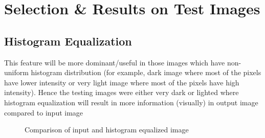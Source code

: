 \documentclass[letterpaper, 10 pt, conference]{ieeeconf}  %
\begin{document}
\section{\textbf{Selection \& Results on Test Images}}
\subsection{\textbf{Histogram Equalization}}
This feature will be more dominant/useful in those images which have non-uniform histogram distribution (for example, dark image where most of the pixels have lower intensity or very light image where most of the pixels have high intensity). Hence the testing images were either very dark or lighted where histogram equalization will result in more information (visually) in output image compared to input image
\begin{figure}[h!]%
	\centering
    \qquad
    \caption{Comparison of input and histogram equalized image}%
    \label{fig:example}%
\end{figure}
\end{document}
